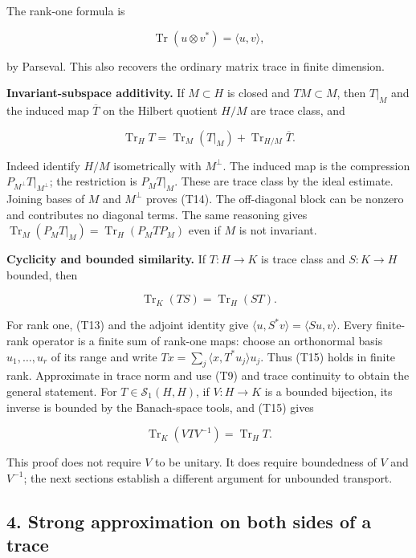 \documentclass[
  11pt,
]{article}
\begin{document}
The rank-one formula is

\[
\operatorname{Tr}(u\otimes v^*)=\langle u,v\rangle,            \tag{T13}
\]

by Parseval. This also recovers the ordinary matrix trace in finite
dimension.

\textbf{Invariant-subspace additivity.} If \(M\subset H\) is closed and
\(TM\subset M\), then \(T|_M\) and the induced map \(\overline T\) on
the Hilbert quotient \(H/M\) are trace class, and

\[
\operatorname{Tr}_H T
=\operatorname{Tr}_M(T|_M)+\operatorname{Tr}_{H/M}\overline T. \tag{T14}
\]

Indeed identify \(H/M\) isometrically with \(M^\perp\). The induced map
is the compression \(P_{M^\perp}T|_{M^\perp}\); the restriction is
\(P_MT|_M\). These are trace class by the ideal estimate. Joining bases
of \(M\) and \(M^\perp\) proves (T14). The off-diagonal block can be
nonzero and contributes no diagonal terms. The same reasoning gives
\(\operatorname{Tr}_M(P_MT|_M)=\operatorname{Tr}_H(P_MTP_M)\) even if
\(M\) is not invariant.

\textbf{Cyclicity and bounded similarity.} If \(T:H\to K\) is trace
class and \(S:K\to H\) bounded, then

\[
\operatorname{Tr}_K(TS)=\operatorname{Tr}_H(ST).              \tag{T15}
\]

For rank one, (T13) and the adjoint identity give
\(\langle u,S^*v\rangle=\langle Su,v\rangle\). Every finite-rank
operator is a finite sum of rank-one maps: choose an orthonormal basis
\(u_1,\ldots,u_r\) of its range and write
\(Tx=\sum_j\langle x,T^*u_j\rangle u_j\). Thus (T15) holds in finite
rank. Approximate in trace norm and use (T9) and trace continuity to
obtain the general statement. For \(T\in\mathcal S_1(H,H)\), if
\(V:H\to K\) is a bounded bijection, its inverse is bounded by the
Banach-space tools, and (T15) gives

\[
\operatorname{Tr}_K(VTV^{-1})=\operatorname{Tr}_H T.          \tag{T16}
\]

This proof does not require \(V\) to be unitary. It does require
boundedness of \(V\) and \(V^{-1}\); the next sections establish a
different argument for unbounded transport.

\subsection{4. Strong approximation on both sides of a
trace}\label{strong-approximation-on-both-sides-of-a-trace}
\end{document}
